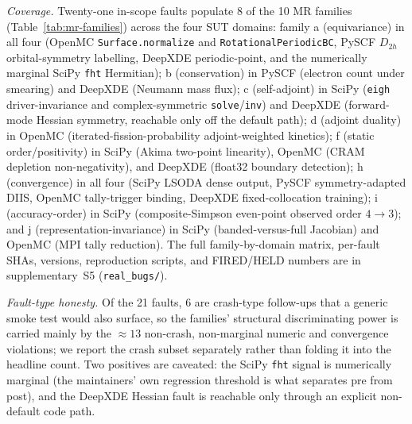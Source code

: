 \documentclass[acmsmall,screen,review]{acmart}
\begin{document}
\emph{Coverage.} Twenty-one in-scope faults populate 8 of the 10 MR families (Table~\ref{tab:mr-families}) across the four SUT domains: family a (equivariance) in all four (OpenMC \texttt{Surface.normalize} and \texttt{RotationalPeriodicBC}, PySCF $D_{2h}$ orbital-symmetry labelling, DeepXDE periodic-point, and the numerically marginal SciPy \texttt{fht} Hermitian); b (conservation) in PySCF (electron count under smearing) and DeepXDE (Neumann mass flux); c (self-adjoint) in SciPy (\texttt{eigh} driver-invariance and complex-symmetric \texttt{solve}/\texttt{inv}) and DeepXDE (forward-mode Hessian symmetry, reachable only off the default path); d (adjoint duality) in OpenMC (iterated-fission-probability adjoint-weighted kinetics); f (static order/positivity) in SciPy (Akima two-point linearity), OpenMC (CRAM depletion non-negativity), and DeepXDE (float32 boundary detection); h (convergence) in all four (SciPy LSODA dense output, PySCF symmetry-adapted DIIS, OpenMC tally-trigger binding, DeepXDE fixed-collocation training); i (accuracy-order) in SciPy (composite-Simpson even-point observed order $4\to 3$); and j (representation-invariance) in SciPy (banded-versus-full Jacobian) and OpenMC (MPI tally reduction). The full family-by-domain matrix, per-fault SHAs, versions, reproduction scripts, and FIRED/HELD numbers are in supplementary~S5 (\texttt{real\_bugs/}).

\emph{Fault-type honesty.} Of the 21 faults, 6 are crash-type follow-ups that a generic smoke test would also surface, so the families' structural discriminating power is carried mainly by the $\approx 13$ non-crash, non-marginal numeric and convergence violations; we report the crash subset separately rather than folding it into the headline count. Two positives are caveated: the SciPy \texttt{fht} signal is numerically marginal (the maintainers' own regression threshold is what separates pre from post), and the DeepXDE Hessian fault is reachable only through an explicit non-default code path.
\end{document}
